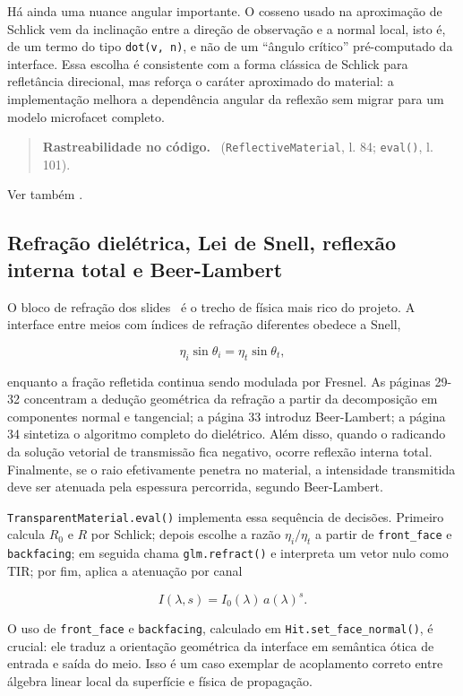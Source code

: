 \documentclass[portuguese]{sbcreviews-2025}%
\makeatletter
\newcommand{\slidescite}[2]{\citep[pp.~#2]{#1}}
\newcommand{\pbrtcontentsurl}{https://pbr-book.org/4ed/contents.html}
\newcommand{\pbrtsectionurl}[1]{%
    \ifcsdef{pbrturl@#1}{\csname pbrturl@#1\endcsname}{\pbrtcontentsurl}%
}
\newcommand{\pbrtsec}[1]{\citep[\href{\pbrtsectionurl{#1}}{Se\c{c}\~ao~#1}]{pharr2023pbrt}}
\newcommand{\traceability}[1]{%
    \begin{quote}
    \footnotesize\textbf{Rastreabilidade no c\'odigo.}~#1
    \end{quote}
}
\makeatother
\begin{document}
Há ainda uma nuance angular importante. O cosseno usado na aproximação de Schlick vem da inclinação entre a direção de observação e a normal local, isto é, de um termo do tipo \texttt{dot(v, n)}, e não de um ``ângulo crítico'' pré-computado da interface. Essa escolha é consistente com a forma clássica de Schlick para refletância direcional, mas reforça o caráter aproximado do material: a implementação melhora a dependência angular da reflexão sem migrar para um modelo microfacet completo.

\traceability{ (\texttt{ReflectiveMaterial}, l. 84; \texttt{eval()}, l. 101).}

Ver também \pbrtsec{9.3}.

\subsection{Refração dielétrica, Lei de Snell, reflexão interna total e Beer-Lambert}
\label{sec:slide5-refracao}

O bloco de refração dos slides~\slidescite{inf2608slides05}{29--36} é o trecho de física mais rico do projeto. A interface entre meios com índices de refração diferentes obedece a Snell,

\[
\eta_i \sin\theta_i = \eta_t \sin\theta_t,
\]

enquanto a fração refletida continua sendo modulada por Fresnel. As páginas 29-32 concentram a dedução geométrica da refração a partir da decomposição em componentes normal e tangencial; a página 33 introduz Beer-Lambert; a página 34 sintetiza o algoritmo completo do dielétrico. Além disso, quando o radicando da solução vetorial de transmissão fica negativo, ocorre reflexão interna total. Finalmente, se o raio efetivamente penetra no material, a intensidade transmitida deve ser atenuada pela espessura percorrida, segundo Beer-Lambert.

\texttt{TransparentMaterial.eval()} implementa essa sequência de decisões. Primeiro calcula $R_0$ e $R$ por Schlick; depois escolhe a razão $\eta_i/\eta_t$ a partir de \texttt{front\_face} e \texttt{backfacing}; em seguida chama \texttt{glm.refract()} e interpreta um vetor nulo como TIR; por fim, aplica a atenuação por canal

\[
I(\lambda,s)=I_0(\lambda)\,a(\lambda)^s.
\]

O uso de \texttt{front\_face} e \texttt{backfacing}, calculado em \texttt{Hit.set\_face\_normal()}, é crucial: ele traduz a orientação geométrica da interface em semântica ótica de entrada e saída do meio. Isso é um caso exemplar de acoplamento correto entre álgebra linear local da superfície e física de propagação.
\end{document}
